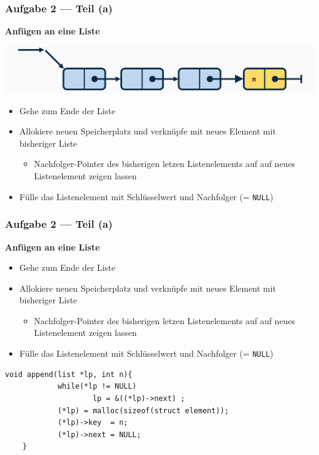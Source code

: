 \documentclass{beamer}
\begin{document}
\begin{frame}[fragile] \frametitle{Aufgabe 2 --- Teil (a)}
	\textbf{Anfügen an eine Liste}
	
	\begin{center}
		\includegraphics[width=\linewidth]{tut06-graphics/tut06-append4}
	\end{center}

	\pause
	
	\begin{itemize}
		\item Gehe zum Ende der Liste
		\item Allokiere neuen Speicherplatz und verknüpfe mit neues Element mit bisheriger Liste
		\begin{itemize}
			\item Nachfolger-Pointer des bisherigen letzen Listenelements auf auf neues Listenelement zeigen lassen
		\end{itemize}
		\item Fülle das Listenelement mit Schlüsselwert und Nachfolger (= \texttt{NULL})
	\end{itemize}
\end{frame}

\begin{frame}[fragile] \frametitle{Aufgabe 2 --- Teil (a)}
	\textbf{Anfügen an eine Liste}
	\begin{itemize}
		\item Gehe zum Ende der Liste
		\item Allokiere neuen Speicherplatz und verknüpfe mit neues Element mit bisheriger Liste
		\begin{itemize}
			\item Nachfolger-Pointer des bisherigen letzen Listenelements auf auf neues Listenelement zeigen lassen
		\end{itemize}
		\item Fülle das Listenelement mit Schlüsselwert und Nachfolger (= \texttt{NULL})
	\end{itemize}

	\pause
	
	\begin{lstlisting}[style=notebook]
	void append(list *lp, int n){
			while(*lp != NULL) 
					lp = &((*lp)->next) ; 
			(*lp) = malloc(sizeof(struct element)); 
			(*lp)->key  = n;   
			(*lp)->next = NULL; 
	}
	\end{lstlisting}
\end{frame}
\end{document}
